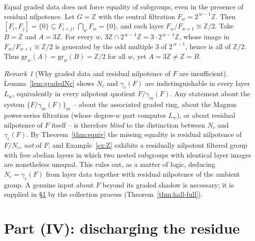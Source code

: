 \documentclass{amsart}
\theoremstyle{definition}
\theoremstyle{remark}
\newtheorem{remark}{Remark}
\begin{document}
\begin{example}\label{ex:Z}
Equal graded data does not force equality of subgroups, even in the presence of
residual nilpotence. Let $G=\mathbb Z$ with the central filtration
$F_w=2^{\,w-1}\mathbb Z$. Then $[F_i,F_j]=\{0\}\subseteq F_{i+j}$,
$\bigcap_w F_w=\{0\}$, and each layer $F_w/F_{w+1}\cong\mathbb Z/2$. Take
$B=\mathbb Z$ and $A=3\mathbb Z$. For every $w$,
$3\mathbb Z\cap2^{\,w-1}\mathbb Z=3\cdot2^{\,w-1}\mathbb Z$, whose image in
$F_w/F_{w+1}\cong\mathbb Z/2$ is generated by the odd multiple $3$ of
$2^{\,w-1}$, hence is all of $\mathbb Z/2$. Thus
$\mathrm{gr}_w(A)=\mathrm{gr}_w(B)=\mathbb Z/2$ for all $w$, yet
$A=3\mathbb Z\ne\mathbb Z=B$.
\end{example}

\begin{remark}[Why graded data and residual nilpotence of $F$ are insufficient]
\label{rem:graded-insufficient}
Lemma~\ref{lem:gradedNc} shows $N_c$ and $\gamma_c(F)$ are indistinguishable in
every layer $L_w$, equivalently in every nilpotent quotient $F/\gamma_m(F)$. Any
statement about the system $\{F/\gamma_m(F)\}_m$ -- about the associated graded
ring, about the Magnus power-series filtration (whose degree-$w$ part computes
$L_w$), or about residual nilpotence of $F$ itself -- is therefore \emph{blind} to
the distinction between $N_c$ and $\gamma_c(F)$. By Theorem~\ref{thm:equiv} the
missing equality is residual nilpotence of $F/N_c$, \emph{not} of $F$; and
Example~\ref{ex:Z} exhibits a residually nilpotent filtered group with free
abelian layers in which two nested subgroups with identical layer images are
nonetheless unequal. This rules out, as a matter of logic, deducing
$N_c=\gamma_c(F)$ from layer data together with residual nilpotence of the ambient
group. A genuine input about $F$ beyond its graded shadow is necessary; it is
supplied in \S\ref{sec:final} by the collection process
(Theorem~\ref{thm:hall-full}).
\end{remark}

\section{Part (IV): discharging the residue}\label{sec:final}
\end{document}
